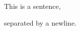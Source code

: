 \documentclass{article}
\begin{document}
\setlength{\parindent}{0cm}
This is a sentence,
\newline

separated by a newline.
\end{document}
